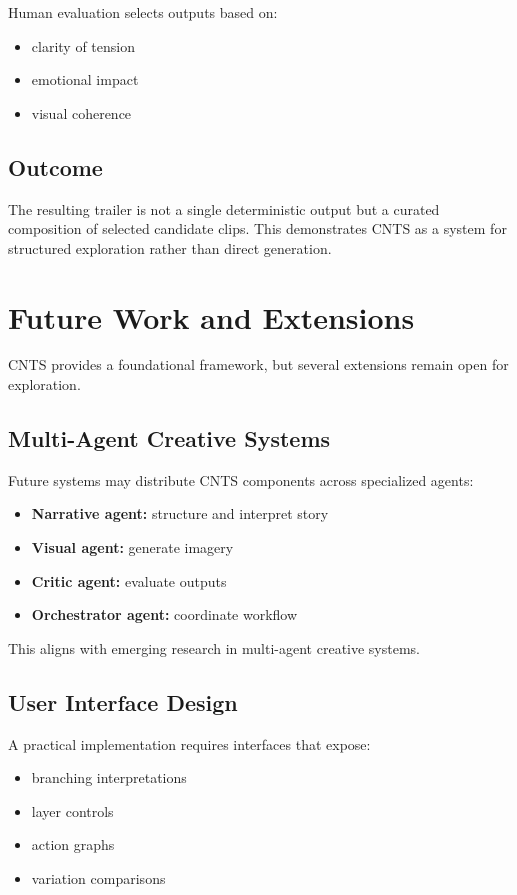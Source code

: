 \documentclass[preprints,article,submit,pdftex,moreauthors,accept]{Definitions/mdpi}
\begin{document}
Human evaluation selects outputs based on:
\begin{itemize}
\item clarity of tension
\item emotional impact
\item visual coherence
\end{itemize}

\subsection{Outcome}

The resulting trailer is not a single deterministic output but a curated composition of selected candidate clips. This demonstrates CNTS as a system for structured exploration rather than direct generation.

\section{Future Work and Extensions}

CNTS provides a foundational framework, but several extensions remain open for exploration.

\subsection{Multi-Agent Creative Systems}

Future systems may distribute CNTS components across specialized agents:

\begin{itemize}
\item \textbf{Narrative agent:} structure and interpret story
\item \textbf{Visual agent:} generate imagery
\item \textbf{Critic agent:} evaluate outputs
\item \textbf{Orchestrator agent:} coordinate workflow
\end{itemize}

This aligns with emerging research in multi-agent creative systems.

\subsection{User Interface Design}

A practical implementation requires interfaces that expose:

\begin{itemize}
\item branching interpretations
\item layer controls
\item action graphs
\item variation comparisons
\end{itemize}
\end{document}
